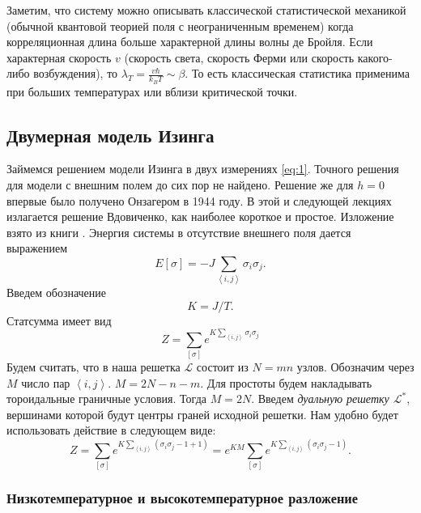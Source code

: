 \documentclass[a4paper,12pt]{article}
\theoremstyle{definition}
\theoremstyle{definition}
\theoremstyle{definition}
\begin{document}
Заметим, что систему можно описывать классической статистической механикой (обычной квантовой
теорией поля с неограниченным временем) когда корреляционная длина больше характерной длины волны де
Бройля. Если характерная скорость $v$ (скорость света, скорость Ферми или скорость какого-либо
возбуждения), то $\lambda_T=\frac{v\hbar}{k_B T}\sim \beta$. То есть классическая статистика
применима при больших температурах или вблизи критической точки. %

\subsection{Двумерная модель Изинга}
\label{sec:ising2d}

Займемся решением модели Изинга в двух измерениях \eqref{eq:1}. Точного решения для модели с внешним
полем до сих пор не найдено. Решение же для $h=0$ впервые было получено Онзагером в 1944 году. В
этой и следующей лекциях излагается решение Вдовиченко, как наиболее короткое и простое. Изложение
взято из книги \cite{belavin2001lect}. 
Энергия системы в отсутствие внешнего поля дается выражением
\begin{equation}
  \label{eq:98}
  E[\sigma]=-J\sum_{\left<i,j\right>}\sigma_i \sigma_j .
\end{equation}
Введем обозначение
\begin{equation}
  \label{eq:99}
  K=J/T.
\end{equation}
Статсумма имеет вид
\begin{equation}
  \label{eq:100}
  Z=\sum_{[\sigma]}e^{K\sum_{\left<i,j\right>}\sigma_i\sigma_j}
\end{equation}
Будем считать, что в наша решетка $\mathcal{L}$ состоит из $N=mn$ узлов. Обозначим через $M$ число
пар $\left<i,j\right>$. $M=2N-n-m$. Для простоты будем накладывать тороидальные граничные условия.
Тогда $M=2N$. Введем {\it дуальную решетку $\mathcal{L}^*$}, вершинами которой будут центры граней
исходной решетки.  
Нам удобно будет использовать действие в следующем виде:
\begin{equation}
  \label{eq:101}
  Z=\sum_{[\sigma]}e^{K\sum_{\left<i,j\right>}(\sigma_i\sigma_j-1+1)}=e^{KM} \sum_{[\sigma]}e^{K\sum_{\left<i,j\right>}(\sigma_i\sigma_j-1)}.
\end{equation}

\subsubsection{Низкотемпературное и высокотемпературное разложение}
\label{sec:low-high-temp}
\end{document}
